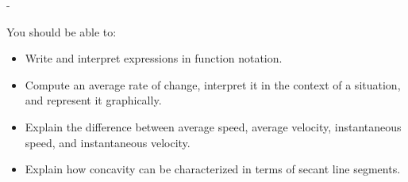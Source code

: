 \documentclass{article}
\makeatletter
\newlength{\tipmargin}
\renewenvironment{framed}{
  \setlength{\tipmargin}{\textwidth-\linewidth}
  \advance\@totalleftmargin-\tipmargin
  \def\FrameCommand{\hspace{\tipmargin}\fbox}%
  \advance\linewidth\tipmargin
  \MakeFramed {\advance\hsize-\width \FrameRestore}%
}
{\endMakeFramed}
\makeatother
\begin{document}

\begin{problemonly}
  \begin{framed}

You should be able to:
    \begin{itemize}[topsep=0pt,partopsep=0pt,parsep=8pt,itemsep=0pt]

    \item Write and interpret expressions in function notation.

    \item Compute an average rate of change, interpret it in the context of a situation, and represent it graphically.

    \item Explain the difference between average speed, average velocity, instantaneous speed, and instantaneous velocity.

    \item Explain how concavity can be characterized in terms of secant line segments.

    \end{itemize}
  \end{framed}
\end{problemonly}
\end{document}
